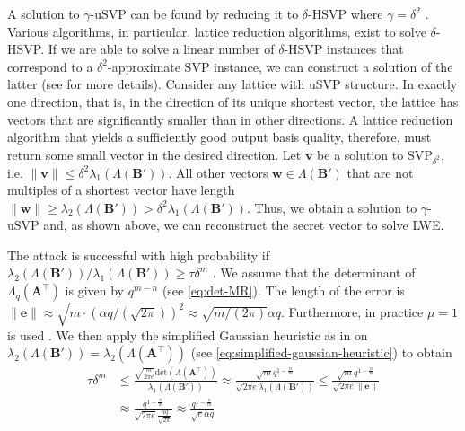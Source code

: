 A solution to $\gamma$-uSVP can be found by reducing it to $\delta$-HSVP where $\gamma = \delta^2$ \cite{APS15}. Various algorithms, in particular, lattice reduction algorithms, exist to solve $\delta$-HSVP. If we are able to solve a linear number of $\delta$-HSVP instances that correspond to a $\delta^2$-approximate SVP instance, we can construct a solution of the latter (see \cite[Section~1.2.21]{Lov87} for more details).
Consider any lattice with uSVP structure. In exactly one direction, that is, in the direction of its unique shortest vector, the lattice has vectors that are significantly smaller than in other directions. A lattice reduction algorithm that yields a sufficiently good output basis quality, therefore, must return some small vector in the desired direction.
Let $\mathbf{v}$ be a solution to SVP$_{\delta^2}$, i.e. $\|\mathbf{v}\| \leq \delta^2 \lambda_1(\Lambda(\mathbf{B}'))$. All other vectors $\mathbf{w}\in \Lambda(\mathbf{B}')$ that are not multiples of a shortest vector have length $\|\mathbf{w}\| \geq \lambda_2(\Lambda(\mathbf{B}')) > \delta^2\lambda_1(\Lambda(\mathbf{B}'))$. Thus, we obtain a solution to $\gamma$-uSVP and, as shown above, we can reconstruct the secret vector to solve LWE.

The attack is successful with high probability if $\lambda_2(\Lambda(\mathbf{B}'))/\lambda_1(\Lambda(\mathbf{B}')) \geq \tau \delta^m$ \cite{AFG13}. We assume that the determinant of $\Lambda_q(\mathbf{A}^\intercal)$ is given by $q^{m-n}$ (see \cref{eq:det-MR}). The length of the error is $\|\mathbf{e}\| \approx \sqrt{m\cdot \left(\alpha q / (\sqrt{2\pi})\right)^2} \approx \sqrt{m / (2\pi)} \alpha q$. Furthermore, in practice $\mu=1$ is used \cite{APS15}. We then apply the simplified Gaussian heuristic as in \cite{Gop16} on $\lambda_2(\Lambda(\mathbf{B}'))=\lambda_2(\Lambda(\mathbf{A}^\intercal))$ (see \cref{eq:simplified-gaussian-heuristic}) to obtain
\begin{align*}
  \tau \delta^m & \leq \frac{ \sqrt{\frac{m}{2\pi e}} \text{det}(\Lambda(\mathbf{A}^\intercal))}{\lambda_1(\Lambda(\mathbf{B}'))} \approx \frac{\sqrt{m} q^{1-\frac{n}{m}}}{\sqrt{2\pi e} \lambda_1(\Lambda(\mathbf{B}'))} \leq \frac{\sqrt{m} q^{1-\frac{n}{m}}}{\sqrt{2\pi e} \|\mathbf{e}\|} \\
                & \approx \frac{q^{1-\frac{n}{m}}}{\sqrt{2\pi e}  \frac{\alpha q}{\sqrt{2\pi}}} \approx \frac{q^{1-\frac{n}{m}}}{\sqrt{e} \alpha q}
\end{align*}

